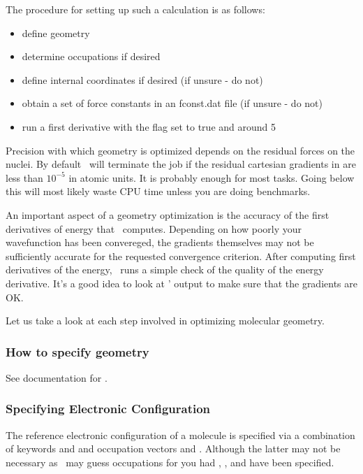 The procedure for setting up such a calculation is as follows: 
\begin{itemize}
\item define geometry 
\item determine occupations if desired
\item define internal coordinates if desired (if unsure - do not)
\item obtain a set of force constants in an fconst.dat file (if unsure - do not) 
\item run a first derivative with the  flag set to true and  around 5
\end{itemize}
Precision with which geometry is optimized depends on the residual
forces on the nuclei. By default \PSIoptking\ will terminate the job
if the residual cartesian gradients in  are less than
$10^{-5}$ in atomic units. It is probably enough for most
tasks. Going below this will most likely waste CPU
time unless you are doing benchmarks.

An important aspect of a geometry optimization is the accuracy
of the first derivatives of energy that \PSIthree\ computes.
Depending on how poorly your wavefunction has been convereged, the
gradients themselves may not be sufficiently accurate for
the requested convergence criterion. After computing first
derivatives of the energy, \PSIcints\ runs a simple check
of the quality of the energy derivative. It's a good idea to
look at \PSIcints ' output to make sure that the gradients are OK. 

Let us take a look at each step involved in optimizing molecular geometry.

\subsubsection{How to specify geometry}
See documentation for \PSIinput .

\subsubsection{Specifying Electronic Configuration}
The reference electronic configuration of a molecule is specified
via a combination of keywords  and 
and occupation vectors  and . Although the latter
may not be necessary as \PSIcscf\ may guess occupations for you
had , , and  have been specified.

